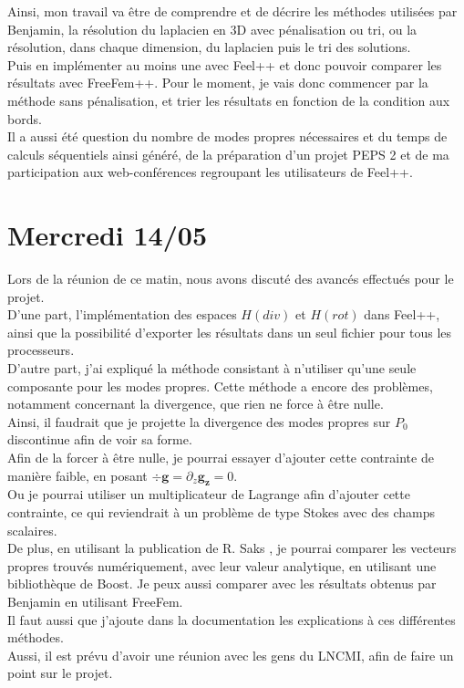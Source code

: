 Ainsi, mon travail va être de comprendre et de décrire les méthodes utilisées par Benjamin, la résolution du laplacien en 3D avec pénalisation ou tri, ou la résolution, dans chaque dimension, du laplacien puis le tri des solutions.\\
Puis en implémenter au moins une avec Feel++ et donc pouvoir comparer les résultats avec FreeFem++. Pour le moment, je vais donc commencer par la méthode sans pénalisation, et trier les résultats en fonction de la condition aux bords.\\
Il a aussi été question du nombre de modes propres nécessaires et du temps de calculs séquentiels ainsi généré, de la préparation d'un projet PEPS 2 et de ma participation aux web-conférences regroupant les utilisateurs de Feel++.

\section{Mercredi 14/05}

Lors de la réunion de ce matin, nous avons discuté des avancés effectués pour le projet.\\
D’une part,  l’implémentation des espaces $H(div)$ et $H(rot)$ dans Feel++, ainsi que la possibilité d’exporter les résultats dans un seul fichier pour tous les processeurs.\\
D’autre part, j’ai expliqué la méthode consistant à n’utiliser qu’une seule composante pour les modes propres. Cette méthode a encore des problèmes, notamment concernant la divergence, que rien ne force à être nulle.\\

Ainsi, il faudrait que je projette la divergence des modes propres sur $P_0$ discontinue afin de voir sa forme.\\
Afin de la forcer à être nulle, je pourrai essayer d’ajouter cette contrainte de manière faible, en posant $\div\bm{g} = \partial_z \bm{g_z} = 0$.\\
Ou je pourrai utiliser un multiplicateur de Lagrange afin d’ajouter cette contrainte, ce qui reviendrait à un problème de type Stokes avec des champs scalaires.\\
De plus, en utilisant la publication de R. Saks \cite{Saks2005}, je pourrai comparer les vecteurs propres trouvés numériquement, avec leur valeur analytique, en utilisant une bibliothèque de Boost. Je peux aussi comparer avec les résultats obtenus par Benjamin en utilisant FreeFem.\\
Il faut aussi que j’ajoute dans la documentation les explications à ces différentes méthodes.\\
Aussi, il est prévu d’avoir une réunion avec les gens du LNCMI, afin de faire un point sur le projet.

